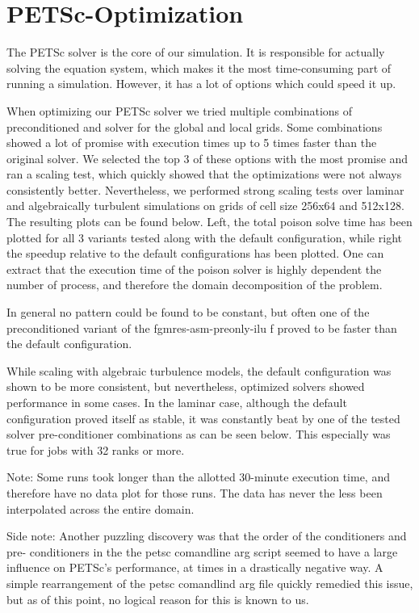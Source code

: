 \chapter{PETSc-Optimization} %
\label{cha:petsc}

The PETSc solver is the core of our simulation. It is responsible for actually
solving the equation system, which makes it the most time-consuming part of
running a simulation. However, it has a lot of options which could speed it up.


When optimizing our PETSc solver we tried multiple combinations of
preconditioned and solver for the global and local grids. Some combinations
showed a lot of promise with execution times up to 5 times faster than the
original solver. We selected the top 3 of these options with the most promise
and ran a scaling test, which quickly showed that the optimizations were not
always consistently better. Nevertheless, we performed strong scaling tests over
laminar and algebraically turbulent simulations on grids of cell size 256x64 and
512x128. The resulting plots can be found below. Left, the total poison solve
time has been plotted for all 3 variants tested along with the default
configuration, while right the speedup relative to the default configurations
has been plotted. One can extract that the execution time of the poison solver
is highly dependent the number of process, and therefore the domain
decomposition of the problem.

In general no pattern could be found to be constant, but often one of the
preconditioned variant of the fgmres-asm-preonly-ilu f proved to be faster than
the default configuration.

While scaling with algebraic turbulence models, the default configuration was
shown to be more consistent, but nevertheless, optimized solvers showed
performance in some cases. In the laminar case, although the default
configuration proved itself as stable, it was constantly beat by one of the
tested solver pre-conditioner combinations as can be seen below.  This
especially was true for jobs with 32 ranks or more.

Note: Some runs took longer than the allotted 30-minute execution time, and
therefore have no data plot for those runs. The data has never the less been
interpolated across the entire domain.

Side note: Another puzzling discovery was that the order of the conditioners and
pre- conditioners in the the petsc comandline arg script seemed to have a large
influence on PETSc's performance, at times in a drastically negative way. A
simple rearrangement of the petsc comandlind arg file quickly remedied this
issue, but as of this point, no logical reason for this is known to us.

